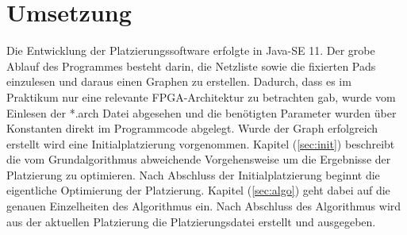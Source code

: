 \chapter{Umsetzung}
    Die Entwicklung der Platzierungssoftware erfolgte in Java-SE 11.
    Der grobe Ablauf des Programmes besteht darin, die Netzliste sowie die fixierten Pads
    einzulesen und daraus einen Graphen zu erstellen.
    Dadurch, dass es im Praktikum nur eine relevante FPGA-Architektur zu betrachten gab,
    wurde vom Einlesen der *.arch Datei abgesehen und die benötigten Parameter wurden über
    Konstanten direkt im Programmcode abgelegt. Wurde der Graph erfolgreich erstellt wird
    eine Initialplatzierung vorgenommen. 
    Kapitel (\ref{sec:init}) beschreibt die vom Grundalgorithmus abweichende Vorgehensweise
    um die Ergebnisse der Platzierung zu optimieren. Nach Abschluss der Initialplatzierung
    beginnt die eigentliche Optimierung der Platzierung. Kapitel (\ref{sec:algo}) geht dabei auf die genauen
    Einzelheiten des Algorithmus ein.
    Nach Abschluss des Algorithmus wird aus der aktuellen Platzierung die
    Platzierungsdatei erstellt und ausgegeben.


